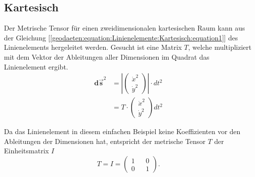 %
%
%
%
\subsection{Kartesisch\label{geodaeten:section:MetrischerTensor:Kartesisch}}

Der Metrische Tensor für einen zweidimensionalen kartesischen Raum kann aus der Gleichung [\ref{geodaeten:equation:Linienelemente:Kartesisch:equation1}] des Linienelements hergeleitet werden.
Gesucht ist eine Matrix $T$, welche multipliziert mit dem Vektor der Ableitungen aller Dimensionen im Quadrat das Linienelement ergibt. 
\begin{equation}
	\begin{aligned} 
	\mathbf{d\vec{s}}^2 &= \left| \begin{pmatrix} \dot{x}^2 \\ \dot{y}^2 \end{pmatrix} \right| \cdot dt^2 \\
	&= T \cdot \begin{pmatrix} \dot{x}^2 \\ \dot{y}^2 \end{pmatrix} dt^2
	\end{aligned}	
\end{equation}

Da das Linienelement in diesem einfachen Beispiel keine Koeffizienten vor den Ableitungen der Dimensionen hat, entspricht der metrische Tensor $T$ der Einheitsmatrix $I$
\begin{equation}
		T = I = \begin{pmatrix} 1 && 0 \\ 0 && 1 \end{pmatrix} .
\end{equation}

